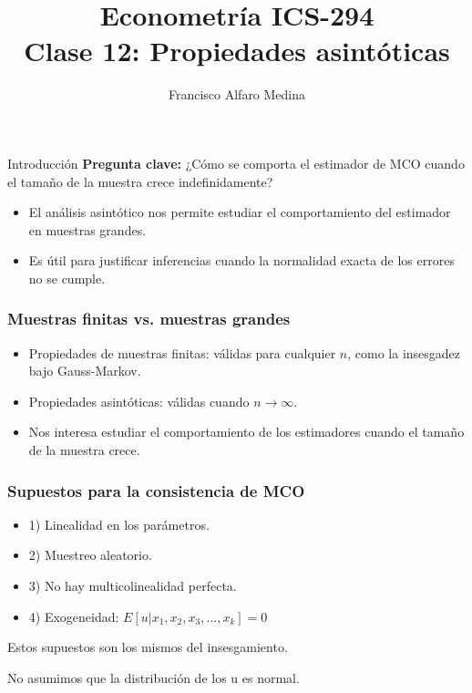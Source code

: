 \documentclass{beamer}
\title[ICS-162]{Econometría ICS-294\\ \small{Clase 12: Propiedades asintóticas  }}
\author{Francisco Alfaro Medina}
\institute[USM]
{Universidad Técnica Federico Santa María\\ %
	\medskip
	\textit{} %
	
}
\date{}
\begin{document}
    
\begin{frame}
	\titlepage %


\end{frame}





\begin{frame}{Introducción}
    \textbf{Pregunta clave:} ¿Cómo se comporta el estimador de MCO cuando el tamaño de la muestra crece indefinidamente? 
    \begin{itemize}
        \item El análisis asintótico nos permite estudiar el comportamiento del estimador en muestras grandes.
        \item Es útil para justificar inferencias cuando la normalidad exacta de los errores no se cumple.
    \end{itemize}
\end{frame}

\begin{frame}
\frametitle{Muestras finitas vs. muestras grandes}
\begin{itemize}
    \item Propiedades de muestras finitas: válidas para cualquier \(n\), como la insesgadez bajo Gauss-Markov.
    \item Propiedades asintóticas: válidas cuando \(n \to \infty\).
    \item Nos interesa estudiar el comportamiento de los estimadores cuando el tamaño de la muestra crece.
\end{itemize}
\end{frame}

\begin{frame}
\frametitle{Supuestos para la consistencia de MCO}
\begin{itemize}
\item 1) Linealidad en los parámetros.
    \item 2) Muestreo aleatorio.
    \item 3) No hay multicolinealidad perfecta. 
    \item 4) Exogeneidad: $E[u | x_1, x_2, x_3, ..., x_k] = 0$
    
\end{itemize}

Estos supuestos son los mismos del insesgamiento. 

No asumimos que la distribución de los u es normal.
\end{frame}
\end{document}
